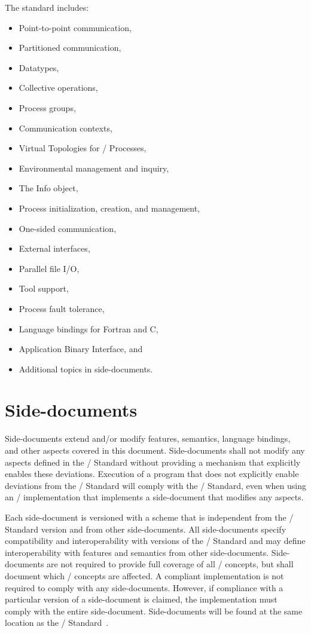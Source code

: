 The standard includes:

\begin{itemize}
    \item Point-to-point communication,
    \item Partitioned communication,
    \item Datatypes,
    \item Collective operations,
    \item Process groups,
    \item Communication contexts,
    \item Virtual Topologies for \MPI/ Processes,
    \item Environmental management and inquiry,
    \item The Info object,
    \item Process initialization, creation, and management,
    \item One-sided communication,
    \item External interfaces,
    \item Parallel file I/O,
    \item Tool support,
    \item Process fault tolerance,
    \item Language bindings for Fortran and C,
    \item Application Binary Interface, and
    \item Additional topics in side-documents.
\end{itemize}

\section{Side-documents}
\label{sec:side-documents}

Side-documents extend and/or modify features, semantics, language bindings, and other aspects covered in this document.
Side-documents shall not modify any aspects defined in the \MPI/ Standard without providing a mechanism that explicitly enables these deviations.
Execution of a program that does not explicitly enable deviations from the \MPI/ Standard will comply with the \MPI/ Standard, even when using an \MPI/ implementation that implements a side-document that modifies any aspects.

Each side-document is versioned with a scheme that is independent from the \MPI/ Standard version and from other side-documents.
All side-documents specify compatibility and interoperability with versions of the \MPI/ Standard and may define interoperability with features and semantics from other side-documents.
Side-documents are not required to provide full coverage of all \MPI/ concepts, but shall document which \MPI/ concepts are affected.
A compliant implementation is not required to comply with any side-documents.
However, if compliance with a particular version of a side-document is claimed, the implementation must comply with the entire side-document.
Side-documents will be found at the same location as the \MPI/ Standard~\cite{mpi-standard-location}.

